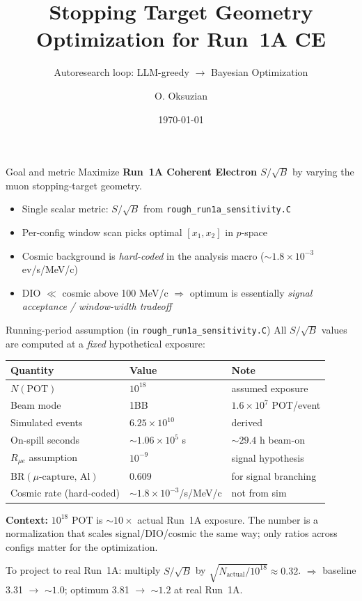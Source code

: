 \documentclass[10pt,aspectratio=169]{beamer}
\title{Stopping Target Geometry Optimization for Run~1A CE}
\subtitle{Autoresearch loop: LLM-greedy \texorpdfstring{$\to$}{->} Bayesian Optimization}
\author{O. Oksuzian}
\institute{Mu2e}
\date{\today}
\begin{document}
\begin{frame}\titlepage\end{frame}

\begin{frame}{Goal and metric}
Maximize \textbf{Run~1A Coherent Electron $S/\sqrt{B}$} by varying the muon
stopping-target geometry.

\medskip
\begin{itemize}
\item Single scalar metric:
      $S/\sqrt{B}$ from \texttt{rough\_run1a\_sensitivity.C}
\item Per-config window scan picks optimal $[x_1, x_2]$ in $p$-space
\item Cosmic background is \emph{hard-coded} in the analysis macro
      ($\sim 1.8 \times 10^{-3}$ ev/s/MeV/c)
\item DIO $\ll$ cosmic above 100 MeV/c $\Rightarrow$ optimum is essentially
      \emph{signal acceptance / window-width tradeoff}
\end{itemize}
\end{frame}

\begin{frame}{Running-period assumption (in \texttt{rough\_run1a\_sensitivity.C})}
All $S/\sqrt{B}$ values are computed at a \emph{fixed} hypothetical exposure:

\medskip
\begin{tabular}{lll}
\toprule
Quantity & Value & Note \\
\midrule
$N(\mathrm{POT})$       & $10^{18}$              & assumed exposure \\
Beam mode               & 1BB                   & $1.6\times 10^{7}$ POT/event \\
Simulated events        & $6.25\times 10^{10}$  & derived \\
On-spill seconds        & $\sim 1.06\times 10^{5}$ s & $\sim 29.4$ h beam-on \\
$R_{\mu e}$ assumption  & $10^{-9}$             & signal hypothesis \\
$\mathrm{BR}(\mu\text{-capture, Al})$ & $0.609$ & for signal branching \\
Cosmic rate (hard-coded)& $\sim 1.8\times 10^{-3}$/s/MeV/c & not from sim \\
\bottomrule
\end{tabular}

\medskip
\textbf{Context:} $10^{18}$ POT is $\sim 10\times$ actual Run~1A exposure.
The number is a normalization that scales signal/DIO/cosmic the same way; only
ratios across configs matter for the optimization.

\smallskip
To project to real Run~1A: multiply $S/\sqrt{B}$ by $\sqrt{N_{\mathrm{actual}}/10^{18}} \approx 0.32$.
$\Rightarrow$ baseline 3.31 $\to$ $\sim 1.0$; optimum 3.81 $\to$ $\sim 1.2$ at real Run~1A.
\end{frame}
\end{document}

